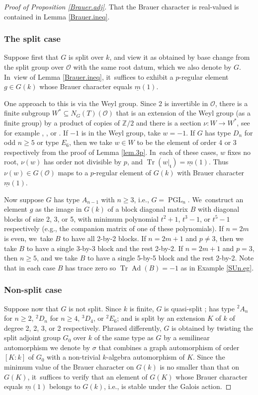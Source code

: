 \documentclass[JEP,XML,SOM,Unicode,NoFloatCountersInSection,published]{cedram}
\newcommand{\proofsec}[1]{\subsubsection*{#1}}
\theoremstyle{definition}
\let\:\colon
\newcommand{\mft}{\mathfrak{t}}
\newcommand{\Z}{\mathbb{Z}}
\newcommand{\mcO}{\mathcal{O}}
\let\cO\mcO
\newcommand{\mmin}{\underline{m}}
\DeclareMathOperator{\PGL}{PGL}
\DeclareMathOperator{\Tr}{Tr}
\DeclareMathOperator{\Ad}{Ad}
\begin{document}
\begin{proof}[Proof of Proposition \ref{Brauer.adj}]
That the Brauer character is real-valued is contained in Lemma \ref{Brauer.ineq}.

\proofsec{The split case} Suppose first that $G$ is split over $k$, and view it as obtained by base change from the split group over $\cO$ with the same root datum, which we also denote by $G$. In~view of Lemma \ref{Brauer.ineq}, it~suffices to exhibit a $p$-regular element $g \in G(k)$ whose Brauer character equals $\mmin(1)$.

One approach to this is via the Weyl group.
Since 2 is invertible in $\cO$, there is a finite subgroup $W^* \subseteq N_G(T)(\cO)$ that is an extension of the Weyl group (as a finite group) by a product of copies of $\Z/2$ and there is a section $\nu \: W \to W^*$, see for example \cite{Ti:etendu}, \cite[\S{IX.4}, Exer.\,12]{Bou:g7}, or \cite{DemTits}.
If $-1$ is in the Weyl group, take $w = -1$. If $G$ has type $D_n$ for odd $n \ge 5$ or type $E_6$, then we take $w \in W$ to be the element of order 4 or 3 respectively from the proof of Lemma \ref{lem.3p}. In~each of these cases, $w$ fixes no root, $\nu(w)$ has order not divisible by $p$, and $\Tr(w\vert_{\mft}) = \mmin(1)$. Thus $\nu(w) \in G(\cO)$ maps to a $p$-regular element of $G(k)$ with Brauer character $\mmin(1)$.

Now suppose $G$ has type $A_{n-1}$ with $n \ge 3$, i.e., $G = \PGL_n$. We~construct an element $g$ as the image in $G(k)$ of a block diagonal matrix $B$ with diagonal blocks of size 2, 3, or 5, with minimum polynomial $t^2 + 1$, $t^3 - 1$, or $t^5 - 1$ respectively (e.g., the companion matrix of one of these polynomials). If $n = 2m$ is even, we~take $B$ to have all 2-by-2 blocks. If $n = 2m+1$ and $p \ne 3$, then we take $B$ to have a single 3-by-3 block and the rest 2-by-2. If $n = 2m+1$ and $p = 3$, then $n \ge 5$, and we take $B$ to have a single 5-by-5 block and the rest 2-by-2. Note that in each case $B$ has trace zero so $\Tr \Ad(B) = -1$ as in Example \ref{SUn.eg}.

\proofsec{Non-split case} Suppose now that $G$ is not split. Since $k$ is finite, $G$ is quasi-split \cite[Prop.\,17.99]{Milne};
has type $^2A_n$ for $n \ge 2$, $^2D_n$ for $n \ge 4$, $^3D_4$, or $^2E_6$;
and is split by an extension $K$ of $k$ of degree 2, 2, 3, or 2 respectively.
Phrased differently, $G$ is obtained by twisting the split adjoint group $G_0$ over $k$ of the same type as $G$ by a semilinear automorphism we denote by $\sigma$ that combines a graph automorphism of order $[K:k]$ of $G_0$ with a non-trivial $k$-algebra automorphism of $K$. Since the minimum value of the Brauer character on $G(k)$ is no smaller than that on $G(K)$, it~suffices to verify that an element of $G(K)$ whose Brauer character equals $\mmin(1)$ belongs to $G(k)$, i.e., is stable under the Galois action.


\end{proof}
\end{document}
